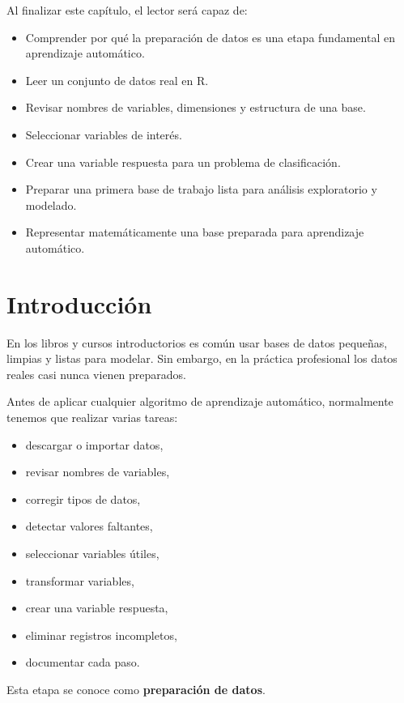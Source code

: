 \documentclass[
  11pt,
  letterpaper,
]{book}
\providecommand{\tightlist}{%
  \setlength{\itemsep}{0pt}\setlength{\parskip}{0pt}}
\begin{document}
Al finalizar este capítulo, el lector será capaz de:

\begin{itemize}
\tightlist
\item
  Comprender por qué la preparación de datos es una etapa fundamental en
  aprendizaje automático.
\item
  Leer un conjunto de datos real en R.
\item
  Revisar nombres de variables, dimensiones y estructura de una base.
\item
  Seleccionar variables de interés.
\item
  Crear una variable respuesta para un problema de clasificación.
\item
  Preparar una primera base de trabajo lista para análisis exploratorio
  y modelado.
\item
  Representar matemáticamente una base preparada para aprendizaje
  automático.
\end{itemize}

\section{Introducción}\label{introducciuxf3n-1}

En los libros y cursos introductorios es común usar bases de datos
pequeñas, limpias y listas para modelar. Sin embargo, en la práctica
profesional los datos reales casi nunca vienen preparados.

Antes de aplicar cualquier algoritmo de aprendizaje automático,
normalmente tenemos que realizar varias tareas:

\begin{itemize}
\tightlist
\item
  descargar o importar datos,
\item
  revisar nombres de variables,
\item
  corregir tipos de datos,
\item
  detectar valores faltantes,
\item
  seleccionar variables útiles,
\item
  transformar variables,
\item
  crear una variable respuesta,
\item
  eliminar registros incompletos,
\item
  documentar cada paso.
\end{itemize}

Esta etapa se conoce como \textbf{preparación de datos}.
\end{document}

